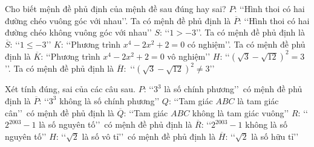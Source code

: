 \begin{ex}%
	Cho biết mệnh đề phủ định của mệnh đề sau  đúng hay sai?
	\choiceTF 
		{$P$: \lq\lq Hình thoi có hai đường chéo vuông góc với nhau\rq\rq. Ta  có mệnh đề phủ định là $\overline{P}$: \lq\lq Hình thoi có hai đường chéo không vuông góc với nhau\rq\rq}
		{$S$: \lq\lq $1>-3$\rq\rq.  Ta có mệnh đề phủ định là $\overline{S}$: \lq\lq $1\leq-3$\rq\rq}
		 {\True $K$: \lq\lq Phương trình $x^4-2x^2+2=0$ có nghiệm\rq\rq. Ta có mệnh đề phủ định là $\overline{K}$: \lq\lq Phương trình $x^4-2x^2+2=0$ vô nghiệm\rq\rq}
		{$H$: \lq\lq $(\sqrt{3}-\sqrt{12})^2=3$\rq\rq. Ta có mệnh đề phủ định là  $\overline{H}:$ \lq\lq $(\sqrt{3}-\sqrt{12})^2\neq 3$\rq\rq}
\end{ex}

\begin{ex}%
	Xét tính đúng, sai của các câu  sau.
	\choiceTF 
		{\True  $P$: \lq\lq $3^3$ là số chính phương\rq\rq\ có mệnh đề phủ định là $\overline{P}$: \lq\lq $3^3$ không là số chính phương\rq\rq}
		 {$Q$: \lq\lq Tam giác $ABC$ là tam giác cân\rq\rq\ có mệnh đề phủ định là $\overline{Q}$: \lq\lq Tam giác $ABC$ không là tam giác vuông\rq\rq}
		{\True $R$: \lq\lq  $2^{2003}-1$ là số nguyên tố\rq\rq\ có mệnh đề phủ định là $\overline{R}$: \lq\lq $2^{2003}-1$ không là số nguyên tố\rq\rq}
		{\True $H$: \lq\lq $\sqrt{2}$ là số vô tỉ\rq\rq\ có mệnh đề phủ định là  $\overline{H}$: \lq\lq $\sqrt{2}$ là số hữu tỉ\rq\rq}
\end{ex}

